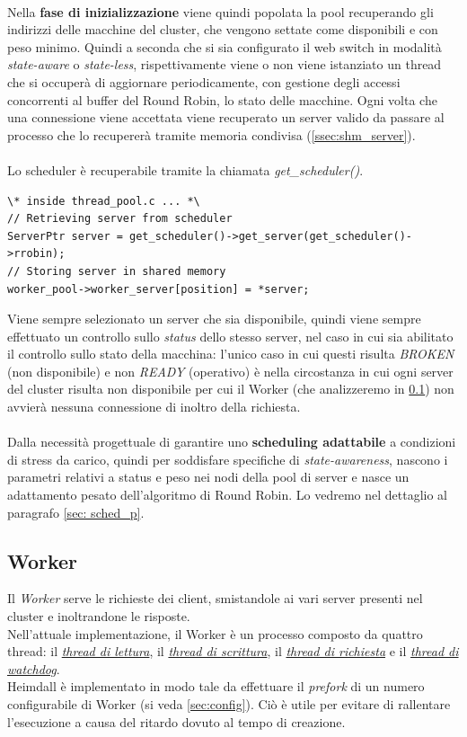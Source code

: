 \documentclass[italian]{tktltiki2}
\begin{document}
\\
Nella \textbf{fase di inizializzazione} viene quindi popolata la pool recuperando gli indirizzi delle macchine del cluster, che vengono settate come disponibili e con peso minimo. Quindi a seconda che si sia configurato il web switch in modalità \emph{state-aware} o \emph{state-less}, rispettivamente viene o non viene istanziato un thread che si occuperà di aggiornare periodicamente, con gestione degli accessi concorrenti al buffer del Round Robin, lo stato delle macchine. Ogni volta che una connessione viene accettata viene recuperato un server valido da passare al processo che lo recupererà tramite memoria condivisa (\ref{ssec:shm_server}).
\\
\\ Lo scheduler è recuperabile tramite la chiamata \emph{get\_scheduler()}.
\begin{lstlisting}
\* inside thread_pool.c ... *\
// Retrieving server from scheduler
ServerPtr server = get_scheduler()->get_server(get_scheduler()->rrobin);
// Storing server in shared memory
worker_pool->worker_server[position] = *server;
\end{lstlisting}
Viene sempre selezionato un server che sia disponibile, quindi viene sempre effettuato un controllo sullo \emph{status} dello stesso server, nel caso in cui sia abilitato il controllo sullo stato della macchina: l'unico caso in cui questi risulta \emph{BROKEN} (non disponibile) e non \emph{READY} (operativo) è nella circostanza in cui ogni server del cluster risulta non disponibile per cui il Worker (che analizzeremo in \ref{sec:worker}) non avvierà nessuna connessione di inoltro della richiesta. 
\\
\\
Dalla necessità progettuale di garantire uno \textbf{scheduling adattabile} a condizioni di stress da carico, quindi per soddisfare specifiche di \emph{state-awareness}, nascono i parametri relativi a status e peso nei nodi della pool di server e nasce un adattamento pesato dell'algoritmo di Round Robin. Lo vedremo nel dettaglio al paragrafo \ref{sec: sched_p}.
\subsection{Worker}
\label{sec:worker}
Il \emph{Worker} serve le richieste dei client, smistandole ai vari server presenti nel cluster e inoltrandone le risposte.
\\
Nell'attuale implementazione, il Worker è un processo composto da quattro thread: il \hyperref[sec:reader]{\emph{thread di lettura}}, il \hyperref[sec:writer]{\emph{thread di scrittura}}, il \hyperref[sec:request]{\emph{thread di richiesta}} e il \hyperref[sec:watchdog]{\emph{thread di watchdog}}.
\\
Heimdall è implementato in modo tale da effettuare il \emph{prefork} di un numero configurabile di Worker (si veda \ref{sec:config}). Ciò è utile per evitare di rallentare l'esecuzione a causa del ritardo dovuto al tempo di creazione.
\end{document}
